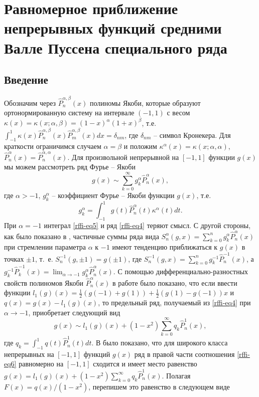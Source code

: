 
\chapter{Равномерное приближение непрерывных функций средними Валле Пуссена специального ряда}
\section{Введение}
Обозначим через $\hat P_n^{\alpha,\beta}(x)$ полиномы Якоби, которые образуют ортонормированную систему на интервале $(-1,1)$ с весом $\kappa(x)=\kappa(x;\alpha,\beta)=(1-x)^\alpha(1+x)^\beta$, т.е. $\int_{-1}^1\kappa(x)\hat P_n^{\alpha,\beta}(x)\hat P_m^{\alpha,\beta}(x)dx=\delta_{nm}$, где $\delta_{nm}$ -- символ Кронекера. Для краткости ограничимся случаем $\alpha=\beta$ и положим $\kappa^\alpha(x)=\kappa(x;\alpha,\alpha)$,
$\hat P_n^{\alpha}(x)=\hat P_n^{\alpha,\alpha}(x)$. Для произвольной непрерывной на $[-1,1]$ функции $g(x)$ мы можем рассмотреть ряд Фурье -- Якоби
\begin{equation}\label{rffi-eq4}
g(x)\sim\sum_{k=0}^\infty g_k^\alpha\hat P_n^{\alpha}(x),
\end{equation}
где $\alpha>-1$, $g_k^\alpha$ -- коэффициент Фурье -- Якоби функции $g(x)$, т.е.
\begin{equation}\label{rffi-eq5}
g_k^\alpha=\int_{-1}^1 g(t)\hat P_n^{\alpha}(t)\kappa^\alpha(t)dt.
\end{equation}
При $\alpha=-1$ интеграл \eqref{rffi-eq5} и ряд \eqref{rffi-eq4} теряют смысл. С другой стороны, как было показано в \cite{rffi-13}, частичные суммы  ряда вида $S_n^\alpha(g,x)=\sum_{k=0}^n g_k^\alpha\hat P_n^{\alpha}(x)$ при стремлении параметра $\alpha$ к $-1$ имеют тенденцию приближаться к $g(x)$ в точках $\pm1$, т.~е. $S_n^{-1}(g,\pm1)=g(\pm1)$, где $S_n^{-1}(g,x)=\sum_{k=0}^n g_k^{-1}\hat P_n^{-1}(x)$, а $ g_k^{-1}\hat P_k^{-1}(x)=\lim_{\alpha\to-1}g_k^\alpha\hat P_n^{\alpha}(x)$. С помощью дифференциально-разностных свойств полиномов Якоби $\hat P_n^{\alpha}(x)$ в работе \cite{rffi-13} было показано, что если ввести функции $l_1(g)(x)=\frac12(g(-1)+g(1))+\frac12(g(1)-g(-1))x$ и $q(x)=g(x)-l_1(g)(x)$, то предельный ряд, получаемый из \eqref{rffi-eq4} при $\alpha\to-1$, приобретает  следующий вид
\begin{equation}\label{rffi-eq6}
g(x)\sim l_1(g)(x)+(1-x^2)\sum_{k=0}^\infty q_k\hat P_n^1(x),
\end{equation}
где $q_k=\int_{-1}^1q(t)\hat P_n^1(t)dt$. В \cite{rffi-13} было показано, что для широкого класса непрерывных на $[-1,1]$ функций $g(x)$ ряд в правой части соотношения \eqref{rffi-eq6} равномерно на $[-1,1]$ сходится и имеет место равенство $g(x)= l_1(g)(x)+(1-x^2)\sum_{k=0}^\infty q_k\hat P_n^1(x)$. Полагая $F(x)=q(x)/(1-x^2)$, перепишем это равенство в следующем виде
